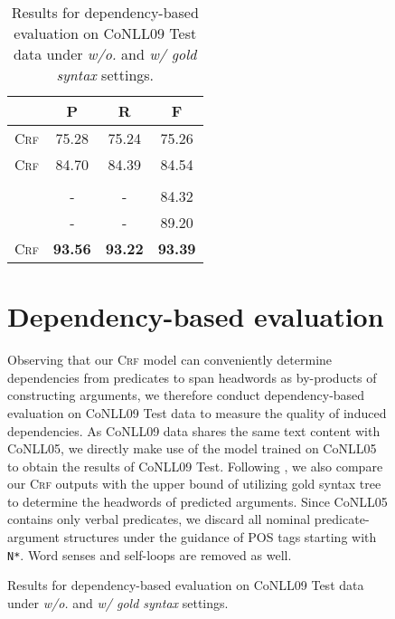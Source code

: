 \documentclass[11pt]{article}
\begin{document}
\begin{figure}[tb!]
\begin{table}[tb!]
    \renewcommand{\arraystretch}{1.1}
    \centering
    \small
    \begin{tabular}{l ccc}
        \toprule
        \rowcolor[gray]{0.95}                           & P              & R              & F          \\
        \midrule
        \textsc{Crf}                                    & 75.28          & 75.24          & 75.26          \\
        \textsc{Crf}                    & 84.70          & 84.39          & 84.54          \\
        \rowcolor[gray]{0.95} \multicolumn{4}{c}{\emph{w/ gold syntax}}                                    \\
        \citet{johansson-nugues-2008-effect}            & -              & -              & 84.32          \\
        \citet{li-etal-2019-dependency} & -              & -              & 89.20          \\
        \textsc{Crf}                    & \textbf{93.56} & \textbf{93.22} & \textbf{93.39} \\
        \bottomrule
    \end{tabular}
    \caption{Results for dependency-based evaluation on CoNLL09 Test data under \emph{w/o.} and \emph{w/ gold syntax} settings.}
    \label{table:conll09}
\end{table}

\section{Dependency-based evaluation}\label{sec:tree-probing}



Observing that our \textsc{Crf} model can conveniently determine dependencies from predicates to span headwords as by-products of constructing arguments, we therefore conduct dependency-based evaluation on CoNLL09 Test data \cite{hajic-etal-2009-conll} to measure the quality of induced dependencies.
As CoNLL09 data shares the same text content with CoNLL05, we directly make use of the model trained on CoNLL05 to obtain the results of CoNLL09 Test.
Following \citet{johansson-nugues-2008-dependency-based,li-etal-2019-dependency}, we also compare our \textsc{Crf} outputs with the upper bound of utilizing gold syntax tree to determine the headwords of predicted arguments.
Since CoNLL05 contains only verbal predicates, we discard all nominal predicate-argument structures under the guidance of POS tags starting with \texttt{N*}.
Word senses and self-loops are removed as well.


\end{figure}
\end{document}
